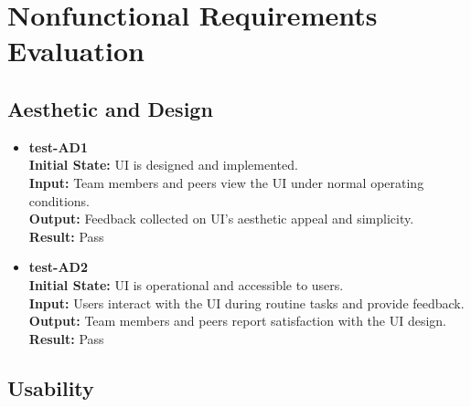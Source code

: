 \documentclass[12pt, titlepage]{article}
\begin{document}
\section{Nonfunctional Requirements Evaluation} \label{section:4}

\subsection{Aesthetic and Design} \label{section:4.1}

\begin{itemize}
\item \textbf{test-AD1} \label{test-AD1} \\
\textbf{Initial State:} UI is designed and implemented. \\
\textbf{Input:} Team members and peers view the UI under normal operating conditions. \\
\textbf{Output:} Feedback collected on UI’s aesthetic appeal and simplicity. \\
\textbf{Result:} Pass \\

\item \textbf{test-AD2} \label{test-AD2} \\
\textbf{Initial State:} UI is operational and accessible to users. \\
\textbf{Input:} Users interact with the UI during routine tasks and provide feedback. \\
\textbf{Output:} Team members and peers report satisfaction with the UI design. \\
\textbf{Result:} Pass \\
\end{itemize}

\subsection{Usability} \label{section:4.2}
\end{document}
